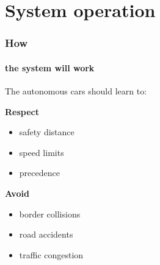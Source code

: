 \documentclass{beamer}
\begin{document}
\section{System operation}
\begin{frame}
	\frametitle{How}
	\framesubtitle{the system will work}

	The autonomous cars should learn to:
	\begin{center}
		\begin{exampleblock}{\textbf{Respect}}
	    \begin{itemize}
			\item safety distance
			\item speed limits
			\item precedence
		\end{itemize}
	    \end{exampleblock}

	    \begin{alertblock}{\textbf{Avoid}}
        \begin{itemize}
			\item border collisions
            \item road accidents
			\item traffic congestion
		\end{itemize}
        \end{alertblock}
	\end{center}
\end{frame}
\end{document}
